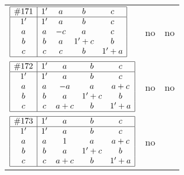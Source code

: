 \documentclass[12pt]{article}
\theoremstyle{definition}
\newcommand{\join}{\mathbin{+}}%
\newcommand{\id}{{1'}}%
\renewcommand{\top}{1}%
\begin{document}
\begin{center}
\begin{longtable}{l|c|c}
$
\begin{array}{|c|cccc|} \hline
\#171 & \id & a & b & c \\ \hline
\id & \id & a & b & c \\
a & a & -c & a & c \\
b & b & a & \id \join c & b \\
c & c & c & b & \id \join a \\ \hline
\end{array}
$
 & no  
 & no      \\[15mm]

$
\begin{array}{|c|cccc|} \hline
\#172 & \id & a & b & c \\ \hline
\id & \id & a & b & c \\
a & a & -a & a & a \join c \\
b & b & a & \id \join c & b \\
c & c & a \join c & b & \id \join a \\ \hline
\end{array}
$
 & no  
 & no      \\[15mm]

$
\begin{array}{|c|cccc|} \hline
\#173 & \id & a & b & c \\ \hline
\id & \id & a & b & c \\
a & a & \top & a & a \join c \\
b & b & a & \id \join c & b \\
c & c & a \join c & b & \id \join a \\ \hline
\end{array}
$
 & no  
 & \adjustbox{valign=c, max height=1.6cm}{$
\left[ \begin{array}{cccccc}
\id & a & a & b & c & a \\ 
a & \id & a & a & a & c \\ 
a & a & \id & a & a & c \\ 
b & a & a & \id & b & a \\ 
c & a & a & b & \id & a \\ 
a & c & c & a & a & \id
\end{array}\right]
$}      \\[15mm]


\end{longtable}
\end{center}
\end{document}
